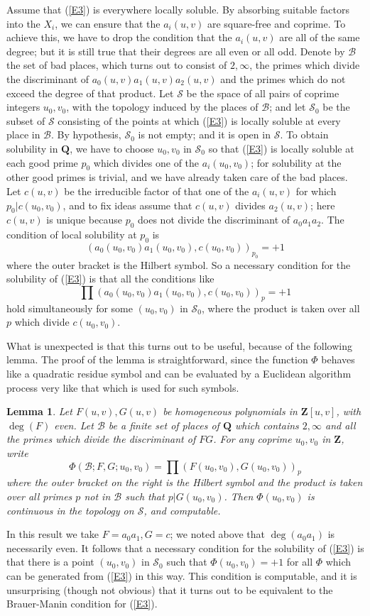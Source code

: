\documentclass[12pt]{article}
\def\bQ{{\mathbf Q}}
\def\bZ{{\mathbf Z}}
\def\sB{{\mathcal B}}
\def\sS{{\mathcal S}}
\def\beq{\begin{equation} \label}
\def\ble{\begin{lemma} \label}
\def\ele{\end{lemma}}
\newtheorem{lemma}{Lemma}
\begin{document}
Assume that (\ref{E3}) is everywhere locally soluble.
By absorbing suitable factors into the $X_i$, we can ensure that the $a_i(u,v)$
are square-free and coprime. To achieve this, we have to drop the condition
that the $a_i(u,v)$ are all of the same degree; but it is still true that
their degrees are all even or all odd. Denote by $\sB$ the set of bad places,
which turns out to consist of $2,\infty$, the primes which divide the
discriminant of $a_0(u,v)a_1(u,v)a_2(u,v)$ and the primes which do not exceed
the degree of that product. Let $\sS$ be the space of all pairs of coprime
integers $u_0,v_0$, with the topology induced by the places of $\sB$; and let
$\sS_0$ be the subset of $\sS$ consisting of the points at which (\ref{E3}) is
locally soluble at every place in $\sB$. By hypothesis, $\sS_0$ is not empty;
and it is open in $\sS$. To obtain solubility in $\bQ$, we have to choose
$u_0,v_0$ in $\sS_0$ so that (\ref{E3}) is locally soluble at each good prime
$p_0$ which divides one of the $a_i(u_0,v_0)$; for solubility at the other
good primes is trivial, and we have already taken care of the bad places.
Let $c(u,v)$ be the irreducible
factor of that one of the $a_i(u,v)$ for which $p_0|c(u_0,v_0)$, and to fix
ideas assume that $c(u,v)$ divides $a_2(u,v)$; here $c(u,v)$ is unique
because $p_0$ does not divide the discriminant of $a_0a_1a_2$. The condition
of local solubility at
$p_0$ is
\beq{E5} (a_0(u_0,v_0)a_1(u_0,v_0),c(u_0,v_0))_{p_0}=+1 \end{equation}
where the outer bracket is the Hilbert symbol. So a necessary condition for
the solubility of (\ref{E3}) is that all the conditions like
\beq{E6} \prod(a_0(u_0,v_0)a_1(u_0,v_0),c(u_0,v_0))_p=+1 \end{equation}
hold simultaneously
for some $(u_0,v_0)$ in $\sS_0$, where the product is taken over all $p$
which divide $c(u_0,v_0)$.

What is unexpected is that this turns out to be useful, because of the
following lemma. The proof of the lemma
is straightforward, since the function $\Phi$
behaves like a quadratic residue symbol and can be evaluated by a Euclidean
algorithm process very like that which is used for such symbols.
\ble{L3} Let $F(u,v),G(u,v)$ be homogeneous polynomials in $\bZ[u,v]$, with
$\deg(F)$ even. Let $\sB$ be a finite set of places of $\bQ$ which contains
$2,\infty$ and all the primes which divide the discriminant of $FG$. For
any coprime $u_0,v_0$ in $\bZ$, write
\beq{E4} \Phi(\sB;F,G;u_0,v_0)=\prod(F(u_0,v_0),G(u_0,v_0))_p \end{equation}
where the outer bracket on the right is the Hilbert symbol and the product is
taken over all primes $p$ not in $\sB$ such that $p|G(u_0,v_0)$.
Then $\Phi(u_0,v_0)$ is continuous in the topology on $\sS$, and computable.
\ele
In this result we take $F=a_0a_1,G=c$; we noted above that $\deg(a_0a_1)$ is
necessarily even. It follows that a necessary condition for the
solubility of (\ref{E3}) is that there is a point $(u_0,v_0)$ in $\sS_0$
such that $\Phi(u_0,v_0)=+1$ for all $\Phi$ which can be generated from
(\ref{E3}) in this way.
This condition is computable, and it is unsurprising (though not obvious)
that it turns out to be equivalent to the Brauer-Manin condition for
(\ref{E3}).
\end{document}
